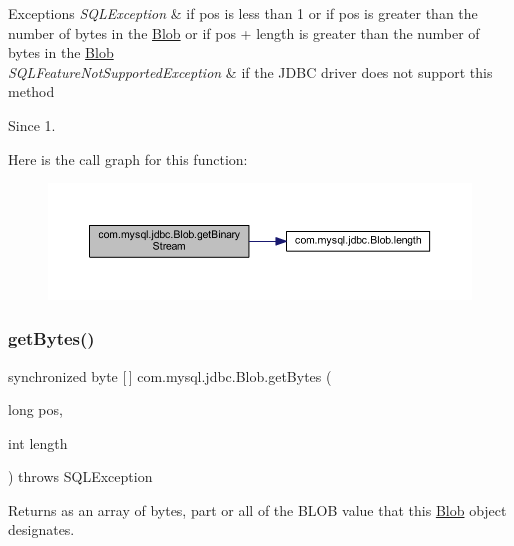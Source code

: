 \begin{DoxyExceptions}{Exceptions}
{\em S\+Q\+L\+Exception} & if pos is less than 1 or if pos is greater than the number of bytes in the {\ttfamily \mbox{\hyperlink{classcom_1_1mysql_1_1jdbc_1_1_blob}{Blob}}} or if pos + length is greater than the number of bytes in the {\ttfamily \mbox{\hyperlink{classcom_1_1mysql_1_1jdbc_1_1_blob}{Blob}}}\\
\hline
{\em S\+Q\+L\+Feature\+Not\+Supported\+Exception} & if the J\+D\+BC driver does not support this method \\
\hline
\end{DoxyExceptions}
\begin{DoxySince}{Since}
1. 
\end{DoxySince}
Here is the call graph for this function\+:\nopagebreak
\begin{figure}[H]
\begin{center}
\leavevmode
\includegraphics[width=350pt]{classcom_1_1mysql_1_1jdbc_1_1_blob_a5c5e58e0fee91fa04afad866e2c87289_cgraph}
\end{center}
\end{figure}
\mbox{\label{classcom_1_1mysql_1_1jdbc_1_1_blob_a7553db3605516634189d77a9cdfbac60}} 
\subsubsection{\texorpdfstring{get\+Bytes()}{getBytes()}}
{\footnotesize\ttfamily synchronized byte \mbox{[}$\,$\mbox{]} com.\+mysql.\+jdbc.\+Blob.\+get\+Bytes (\begin{DoxyParamCaption}\item[{long}]{pos,  }\item[{int}]{length }\end{DoxyParamCaption}) throws S\+Q\+L\+Exception}

Returns as an array of bytes, part or all of the B\+L\+OB value that this \mbox{\hyperlink{classcom_1_1mysql_1_1jdbc_1_1_blob}{Blob}} object designates.


